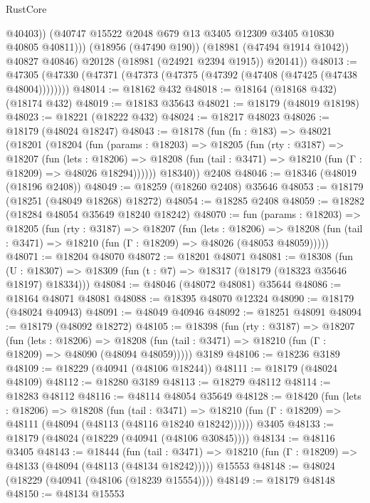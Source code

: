 \begin{lexlean}{RustCore}
\begin{coremodule}
                  @40403))
              (@40747 @15522 @2048 @679 @13 @3405 @12309 @3405 @10830 @40805 @40811)))
          (@18956 (@47490 @190))
          (@18981 (@47494 @1914 @1042))
          @40827
          @40846)
        @20128
        (@18981 (@24921 @2394 @1915))
        @20141))
@48013 := @47305 (@47330 (@47371 (@47373 (@47375 (@47392 (@47408 (@47425 (@47438 @48004))))))))
@48014 := @18162 @432
@48018 := @18164 (@18168 @432) (@18174 @432)
@48019 := @18183 @35643
@48021 := @18179 (@48019 @18198)
@48023 := @18221 (@18222 @432)
@48024 := @18217 @48023
@48026 := @18179 (@48024 @18247)
@48043 := @18178
    (fun (fn : @183) =>
    @48021
      (@18201
        (@18204
          (fun (params : @18203) =>
          @18205
            (fun (rty : @3187) =>
            @18207
              (fun (lets : @18206) =>
              @18208 (fun (tail : @3471) => @18210 (fun (Γ : @18209) => @48026 @18294))))))
        @18340))
    @2408
@48046 := @18346 (@48019 (@18196 @2408))
@48049 := @18259 (@18260 @2408) @35646
@48053 := @18179 (@18251 (@48049 @18268) @18272)
@48054 := @18285 @2408
@48059 := @18282 (@18284 @48054 @35649 @18240 @18242)
@48070 := fun (params : @18203) =>
  @18205
    (fun (rty : @3187) =>
    @18207
      (fun (lets : @18206) =>
      @18208 (fun (tail : @3471) => @18210 (fun (Γ : @18209) => @48026 (@48053 @48059)))))
@48071 := @18204 @48070
@48072 := @18201 @48071
@48081 := @18308
    (fun (U : @18307) => @18309 (fun (t : @7) => @18317 (@18179 (@18323 @35646 @18197) @18334)))
@48084 := @48046 (@48072 @48081) @35644
@48086 := @18164 @48071 @48081
@48088 := @18395 @48070 @12324
@48090 := @18179 (@48024 @40943)
@48091 := @48049 @40946
@48092 := @18251 @48091
@48094 := @18179 (@48092 @18272)
@48105 := @18398
    (fun (rty : @3187) =>
    @18207
      (fun (lets : @18206) =>
      @18208 (fun (tail : @3471) => @18210 (fun (Γ : @18209) => @48090 (@48094 @48059)))))
    @3189
@48106 := @18236 @3189
@48109 := @18229 (@40941 (@48106 @18244))
@48111 := @18179 (@48024 @48109)
@48112 := @18280 @3189
@48113 := @18279 @48112
@48114 := @18283 @48112
@48116 := @48114 @48054 @35649
@48128 := @18420
    (fun (lets : @18206) =>
    @18208
      (fun (tail : @3471) =>
      @18210 (fun (Γ : @18209) => @48111 (@48094 (@48113 (@48116 @18240 @18242))))))
    @3405
@48133 := @18179 (@48024 (@18229 (@40941 (@48106 @30845))))
@48134 := @48116 @3405
@48143 := @18444
    (fun (tail : @3471) => @18210 (fun (Γ : @18209) => @48133 (@48094 (@48113 (@48134 @18242)))))
    @15553
@48148 := @48024 (@18229 (@40941 (@48106 (@18239 @15554))))
@48149 := @18179 @48148
@48150 := @48134 @15553

\end{coremodule}
\end{lexlean}
